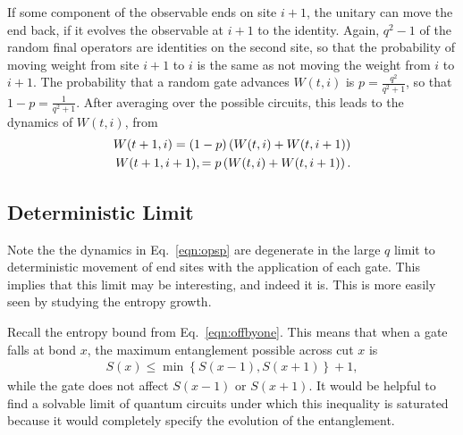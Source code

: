 If some component of the observable ends on site $i+1$, the unitary can move the end back, if it evolves the observable at $i+1$ to the identity. Again, $q^2-1$ of the random final operators are identities on the second site, so that the probability of moving weight from site $i+1$ to $i$ is the same as not moving the weight from $i$ to $i+1$. The probability that a random gate advances $W(t,i)$ is $p = \frac{q^2}{q^2+1}$, so that $1-p = \frac{1}{q^2+1}$. After averaging over the possible circuits, this leads to the dynamics of $W(t,i)$, from~\cite{Keyserlingk}
\begin{align}
W(t+1, i) = (1-p)\left(W(t, i) + W(t, i+1)\right)\nonumber\\
W(t+1, i+1), = p\left(W(t, i) + W(t, i+1)\right). \label{eqn:opsp}
\end{align}
%
%

\subsection{Deterministic Limit}  \label{sub:determ}

Note the the dynamics in Eq.~\ref{eqn:opsp} are degenerate in the large $q$ limit to deterministic movement of end sites with the application of each gate. This implies that this limit may be interesting, and indeed it is. This is more easily seen by studying the entropy growth.

Recall the entropy bound from Eq.~\ref{eqn:offbyone}. This means that when a gate falls at bond $x$, the maximum entanglement possible across cut $x$ is 
\begin{align}
S(x) \le \min\left\lbrace S(x-1), S(x+1)\right\rbrace + 1, \nonumber
\end{align}
while the gate does not affect $S(x-1)$ or $S(x+1)$. It would be helpful to find a solvable limit of quantum circuits under which this inequality is saturated because it would completely specify the evolution of the entanglement. 

